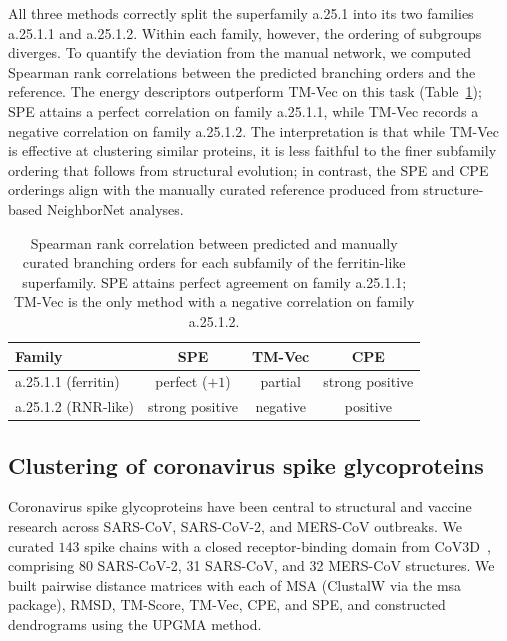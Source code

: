 \documentclass[11pt]{article}
\begin{document}
All three methods correctly split the superfamily a.25.1 into its two
families a.25.1.1 and a.25.1.2. Within each family, however, the ordering
of subgroups diverges. To quantify the deviation from the manual network,
we computed Spearman rank correlations between the predicted branching
orders and the reference. The energy descriptors outperform TM-Vec on this
task (Table~\ref{tab:tab2}); SPE attains a perfect correlation on
family a.25.1.1, while TM-Vec records a negative correlation on family
a.25.1.2. The interpretation is that while TM-Vec is effective at clustering
similar proteins, it is less faithful to the finer subfamily ordering that
follows from structural evolution; in contrast, the SPE and CPE orderings
align with the manually curated reference produced from structure-based
NeighborNet analyses.

\begin{table}[t]
\centering
\caption{Spearman rank correlation between predicted and manually curated
branching orders for each subfamily of the ferritin-like superfamily.
SPE attains perfect agreement on family a.25.1.1; TM-Vec is the only method
with a negative correlation on family a.25.1.2.}
\label{tab:tab2}
\begin{tabular}{lccc}
\toprule
Family & SPE & TM-Vec & CPE \\
\midrule
a.25.1.1 (ferritin) & perfect ($+1$) & partial & strong positive \\
a.25.1.2 (RNR-like) & strong positive & negative & positive \\
\bottomrule
\end{tabular}
\end{table}

\subsection{Clustering of coronavirus spike glycoproteins}

Coronavirus spike glycoproteins have been central to structural and vaccine
research across SARS-CoV, SARS-CoV-2, and MERS-CoV outbreaks. We curated
$143$ spike chains with a closed receptor-binding domain from
CoV3D~\citep{gowthaman2021cov3d}, comprising 80 SARS-CoV-2, 31 SARS-CoV, and
32 MERS-CoV structures. We built pairwise distance matrices with each of
MSA (ClustalW via the msa package), RMSD, TM-Score, TM-Vec, CPE, and SPE,
and constructed dendrograms using the UPGMA method.
\end{document}

